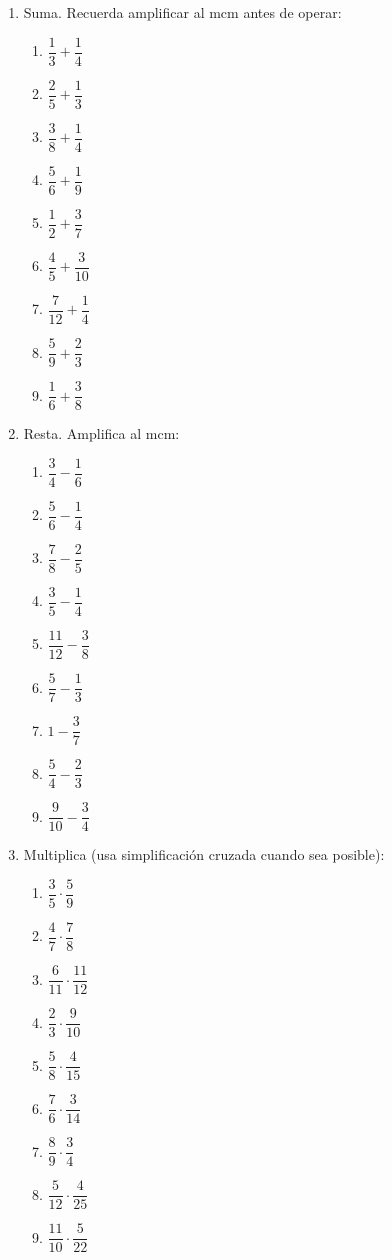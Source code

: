 \documentclass[11pt, letterpaper]{article}
\begin{document}
\begin{enumerate}[label=\textbf{\arabic*.}, leftmargin=*]

\item Suma. Recuerda amplificar al mcm antes de operar:
\begin{multicols}{3}
\begin{enumerate}[label=\alph*)]
  \item $\dfrac{1}{3}+\dfrac{1}{4}$
  \item $\dfrac{2}{5}+\dfrac{1}{3}$
  \item $\dfrac{3}{8}+\dfrac{1}{4}$
  \item $\dfrac{5}{6}+\dfrac{1}{9}$
  \item $\dfrac{1}{2}+\dfrac{3}{7}$
  \item $\dfrac{4}{5}+\dfrac{3}{10}$
  \item $\dfrac{7}{12}+\dfrac{1}{4}$
  \item $\dfrac{5}{9}+\dfrac{2}{3}$
  \item $\dfrac{1}{6}+\dfrac{3}{8}$
\end{enumerate}
\end{multicols}

\item Resta. Amplifica al mcm:
\begin{multicols}{3}
\begin{enumerate}[label=\alph*)]
  \item $\dfrac{3}{4}-\dfrac{1}{6}$
  \item $\dfrac{5}{6}-\dfrac{1}{4}$
  \item $\dfrac{7}{8}-\dfrac{2}{5}$
  \item $\dfrac{3}{5}-\dfrac{1}{4}$
  \item $\dfrac{11}{12}-\dfrac{3}{8}$
  \item $\dfrac{5}{7}-\dfrac{1}{3}$
  \item $1-\dfrac{3}{7}$
  \item $\dfrac{5}{4}-\dfrac{2}{3}$
  \item $\dfrac{9}{10}-\dfrac{3}{4}$
\end{enumerate}
\end{multicols}

\item Multiplica (usa simplificaci\'on cruzada cuando sea posible):
\begin{multicols}{3}
\begin{enumerate}[label=\alph*)]
  \item $\dfrac{3}{5}\cdot\dfrac{5}{9}$
  \item $\dfrac{4}{7}\cdot\dfrac{7}{8}$
  \item $\dfrac{6}{11}\cdot\dfrac{11}{12}$
  \item $\dfrac{2}{3}\cdot\dfrac{9}{10}$
  \item $\dfrac{5}{8}\cdot\dfrac{4}{15}$
  \item $\dfrac{7}{6}\cdot\dfrac{3}{14}$
  \item $\dfrac{8}{9}\cdot\dfrac{3}{4}$
  \item $\dfrac{5}{12}\cdot\dfrac{4}{25}$
  \item $\dfrac{11}{10}\cdot\dfrac{5}{22}$
\end{enumerate}
\end{multicols}


\end{enumerate}
\end{document}
